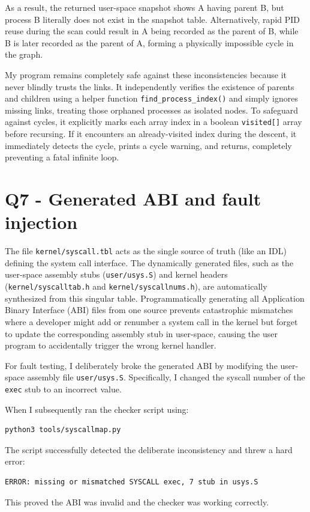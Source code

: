 \documentclass[11pt,a4paper]{article}
\begin{document}
As a result, the returned user-space snapshot shows A having parent B, but process B literally does not exist in the snapshot table. Alternatively, rapid PID reuse during the scan could result in A being recorded as the parent of B, while B is later recorded as the parent of A, forming a physically impossible cycle in the graph.

My program remains completely safe against these inconsistencies because it never blindly trusts the links. It independently verifies the existence of parents and children using a helper function \texttt{find\_process\_index()} and simply ignores missing links, treating those orphaned processes as isolated nodes. To safeguard against cycles, it explicitly marks each array index in a boolean \texttt{visited[]} array before recursing. If it encounters an already-visited index during the descent, it immediately detects the cycle, prints a cycle warning, and returns, completely preventing a fatal infinite loop.

\section*{Q7 - Generated ABI and fault injection}

The file \texttt{kernel/syscall.tbl} acts as the single source of truth (like an IDL) defining the system call interface. The dynamically generated files, such as the user-space assembly stubs (\texttt{user/usys.S}) and kernel headers (\texttt{kernel/syscalltab.h} and \texttt{kernel/syscallnums.h}), are automatically synthesized from this singular table. Programmatically generating all Application Binary Interface (ABI) files from one source prevents catastrophic mismatches where a developer might add or renumber a system call in the kernel but forget to update the corresponding assembly stub in user-space, causing the user program to accidentally trigger the wrong kernel handler.

For fault testing, I deliberately broke the generated ABI by modifying the user-space assembly file \texttt{user/usys.S}. Specifically, I changed the syscall number of the \texttt{exec} stub to an incorrect value. 

When I subsequently ran the checker script using:
\begin{verbatim}
python3 tools/syscallmap.py
\end{verbatim}

The script successfully detected the deliberate inconsistency and threw a hard error:
\begin{verbatim}
ERROR: missing or mismatched SYSCALL exec, 7 stub in usys.S
\end{verbatim}
This proved the ABI was invalid and the checker was working correctly.
\end{document}
